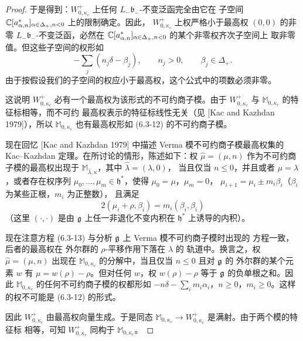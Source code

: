 \begin{proof}
    于是得到：$W^+_{0,\kappa_c}$ 上任何 $L_-\mathfrak b_-$-不变泛函完全由它在
    子空间 $\mathbb{C}[a^*_{\alpha,n}]_{\alpha\in\Delta_+,n<0}$ 上的限制确定。因此，
    $W^+_{0,\kappa_c}$ 上权严格小于最高权 $(0,0)$ 的非零
    $L_-\mathfrak b_-$-不变泛函，必然在
    $\mathbb{C}[a^*_{\alpha,n}]_{\alpha\in\Delta_+,n<0}$ 的某个非零权齐次子空间上
    取非零值。但这些子空间的权形如
    \begin{equation}
        -\sum_j(n_j\delta-\beta_j),\qquad n_j>0,\qquad
        \beta_j\in\Delta_+.
        \tag{6.3-12}
    \end{equation}
    由于按假设我们的子空间的权应小于最高权，这个公式中的项数必须非零。

    这说明 $W^+_{0,\kappa_c}$ 必有一个最高权为该形式的不可约商子模。由于
    $W^+_{0,\kappa_c}$ 与 $\mathbb M_{0,\kappa_c}$ 的特征标相等，而不可约
    最高权表示的特征标线性无关（见 [Kac and Kazhdan 1979]），所以
    $\mathbb M_{0,\kappa_c}$ 也有最高权形如 (6.3-12) 的不可约商子模。

    现在回忆 [Kac and Kazhdan 1979] 中描述 Verma 模不可约商子模最高权集的
    Kac--Kazhdan 定理。在所讨论的情形，陈述如下：权
    $\widehat\mu=(\mu,n)$ 作为不可约商子模的最高权出现于
    $\mathbb M_{\widehat\lambda,\kappa}$，其中 $\widehat\lambda=(\lambda,0)$，
    当且仅当 $n\le0$，并且或者 $\mu=\lambda$，或者存在权序列
    $\mu_0,\dots,\mu_m\in\mathfrak h^*$，使得 $\mu_0=\mu$，$\mu_m=0$，
    $\mu_{i+1}=\mu_i\pm m_i\beta_i$（$\beta_i$ 为某些正根，$m_i$ 为正整数），
    且满足
    \begin{equation}
        2(\mu_i+\rho,\beta_i)=m_i(\beta_i,\beta_i)
        \tag{6.3-13}
    \end{equation}
    （这里 $(\cdot,\cdot)$ 是由 $\mathfrak{g}$ 上任一非退化不变内积在
    $\mathfrak h^*$ 上诱导的内积）。

    现在注意方程 (6.3-13) 与分析 $\mathfrak{g}$ 上 Verma 模不可约商子模时出现的
    方程一致，后者的最高权在 外尔群的 $\rho$-平移作用下落在 $\lambda$ 的
    轨道中。换言之，权 $\widehat\mu=(\mu,n)$ 出现在
    $\mathbb M_{0,\kappa_c}$ 的分解中，当且仅当 $n\le0$ 且对 $\mathfrak{g}$ 的
    外尔群的某个元素 $w$ 有 $\mu=w(\rho)-\rho$。但对任何 $w$，权
    $w(\rho)-\rho$ 等于 $\mathfrak{g}$ 的负单根之和。因此 $\mathbb M_{0,\kappa_c}$
    的任何不可约商子模的权都形如
    $-n\delta-\sum_im_i\alpha_i$，$n\ge0$，$m_i\ge0$。这样的权不可能是
    (6.3-12) 的形式。

    因此 $W^+_{0,\kappa_c}$ 由最高权向量生成。于是同态
    $\mathbb M_{0,\kappa_c}\to W^+_{0,\kappa_c}$ 是满射。由于两个模的特征标
    相等，可知 $W^+_{0,\kappa_c}$ 同构于 $\mathbb M_{0,\kappa_c}$。
\end{proof}

